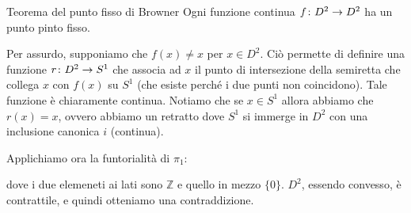 \documentclass[a4paper]{article}
\begin{document}
\begin{snippettheorem}{Teorema del punto fisso di Browner}
    Ogni funzione continua \(f \colon D^2 \to D^2\)
    ha un punto pinto fisso.
\end{snippettheorem}

\begin{snippetproof}{}
    Per assurdo, supponiamo che \(f(x) \neq x\) per \(x \in D^2\).
    Ciò permette di definire una funzione
    \(r \colon D^2 \to S^1\) che associa ad \(x\) il punto di intersezione
    della semiretta che collega \(x\) con \(f(x)\) su \(S^1\) (che esiste perché i due punti non coincidono).
    Tale funzione è chiaramente continua.
    Notiamo che se \(x \in S^1\) allora abbiamo che \(r(x) = x\), ovvero abbiamo un retratto
    dove \(S^1\) si immerge in \(D^2\) con una inclusione canonica \(i\) (continua).
    \begin{center}
    \end{center}
    Applichiamo ora la funtorialità di \(\pi_1\):
    \begin{center}
    \end{center}
    dove i due elemeneti ai lati sono \(\mathbb{Z}\) e quello in mezzo \(\{0\}\).
    \(D^2\), essendo convesso, è contrattile, e quindi otteniamo una contraddizione.
\end{snippetproof}


\pagebreak
\end{document}
